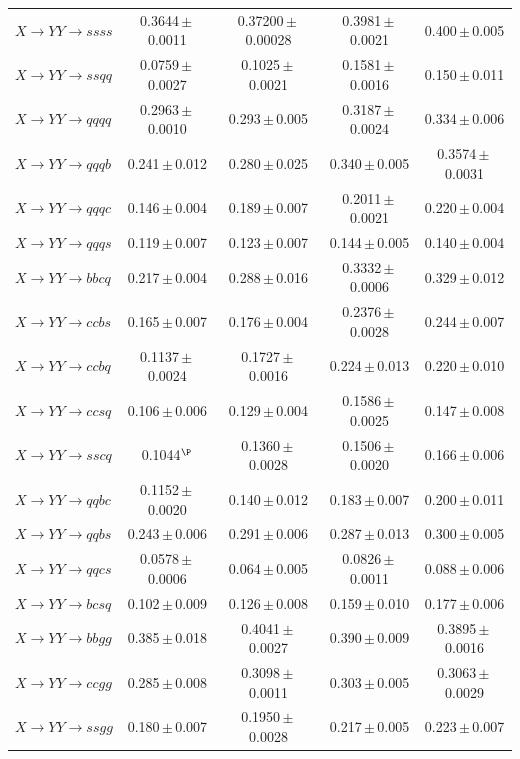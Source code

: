\begin{landscape}
{\begin{longtable}{@{\extracolsep{\fill}}lcccc@{}}
$X\to YY\to ssss$ & 0.3644\,$\pm$\,0.0011 & 0.37200\,$\pm$\,0.00028 & 0.3981\,$\pm$\,0.0021 & 0.400\,$\pm$\,0.005 \\
$X\to YY\to ssqq$ & 0.0759\,$\pm$\,0.0027 & 0.1025\,$\pm$\,0.0021 & 0.1581\,$\pm$\,0.0016 & 0.150\,$\pm$\,0.011 \\
$X\to YY\to qqqq$ & 0.2963\,$\pm$\,0.0010 & 0.293\,$\pm$\,0.005 & 0.3187\,$\pm$\,0.0024 & 0.334\,$\pm$\,0.006 \\
$X\to YY\to qqqb$ & 0.241\,$\pm$\,0.012 & 0.280\,$\pm$\,0.025 & 0.340\,$\pm$\,0.005 & 0.3574\,$\pm$\,0.0031 \\
$X\to YY\to qqqc$ & 0.146\,$\pm$\,0.004 & 0.189\,$\pm$\,0.007 & 0.2011\,$\pm$\,0.0021 & 0.220\,$\pm$\,0.004 \\
$X\to YY\to qqqs$ & 0.119\,$\pm$\,0.007 & 0.123\,$\pm$\,0.007 & 0.144\,$\pm$\,0.005 & 0.140\,$\pm$\,0.004 \\
$X\to YY\to bbcq$ & 0.217\,$\pm$\,0.004 & 0.288\,$\pm$\,0.016 & 0.3332\,$\pm$\,0.0006 & 0.329\,$\pm$\,0.012 \\
$X\to YY\to ccbs$ & 0.165\,$\pm$\,0.007 & 0.176\,$\pm$\,0.004 & 0.2376\,$\pm$\,0.0028 & 0.244\,$\pm$\,0.007 \\
$X\to YY\to ccbq$ & 0.1137\,$\pm$\,0.0024 & 0.1727\,$\pm$\,0.0016 & 0.224\,$\pm$\,0.013 & 0.220\,$\pm$\,0.010 \\
$X\to YY\to ccsq$ & 0.106\,$\pm$\,0.006 & 0.129\,$\pm$\,0.004 & 0.1586\,$\pm$\,0.0025 & 0.147\,$\pm$\,0.008 \\
$X\to YY\to sscq$ & 0.1044$^{\P}$ & 0.1360\,$\pm$\,0.0028 & 0.1506\,$\pm$\,0.0020 & 0.166\,$\pm$\,0.006 \\
$X\to YY\to qqbc$ & 0.1152\,$\pm$\,0.0020 & 0.140\,$\pm$\,0.012 & 0.183\,$\pm$\,0.007 & 0.200\,$\pm$\,0.011 \\
$X\to YY\to qqbs$ & 0.243\,$\pm$\,0.006 & 0.291\,$\pm$\,0.006 & 0.287\,$\pm$\,0.013 & 0.300\,$\pm$\,0.005 \\
$X\to YY\to qqcs$ & 0.0578\,$\pm$\,0.0006 & 0.064\,$\pm$\,0.005 & 0.0826\,$\pm$\,0.0011 & 0.088\,$\pm$\,0.006 \\
$X\to YY\to bcsq$ & 0.102\,$\pm$\,0.009 & 0.126\,$\pm$\,0.008 & 0.159\,$\pm$\,0.010 & 0.177\,$\pm$\,0.006 \\
$X\to YY\to bbgg$ & 0.385\,$\pm$\,0.018 & 0.4041\,$\pm$\,0.0027 & 0.390\,$\pm$\,0.009 & 0.3895\,$\pm$\,0.0016 \\
$X\to YY\to ccgg$ & 0.285\,$\pm$\,0.008 & 0.3098\,$\pm$\,0.0011 & 0.303\,$\pm$\,0.005 & 0.3063\,$\pm$\,0.0029 \\
$X\to YY\to ssgg$ & 0.180\,$\pm$\,0.007 & 0.1950\,$\pm$\,0.0028 & 0.217\,$\pm$\,0.005 & 0.223\,$\pm$\,0.007 \\

\end{longtable}}
\end{landscape}

